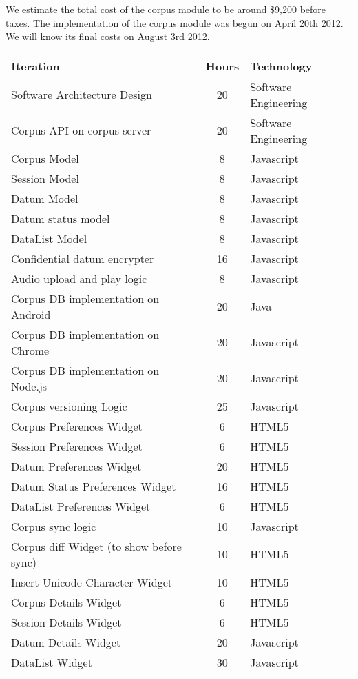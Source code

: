 \documentclass[12 pt]{article}
\begin{document}
We estimate the total cost of the corpus module to be around \$9,200 before taxes. The implementation of the corpus module was begun on April 20th 2012. We will know its final costs on August 3rd 2012.
\begin{table}[htbp]
\begin{center}
  \begin{tabular}{ | lcl | }
\hline

Iteration&	Hours&	Technology	\\
\hline
Software Architecture Design&	20&	Software Engineering	\\ 
Corpus API on corpus server&	20&	Software Engineering\\ 
Corpus Model&	8&	Javascript	\\ 
Session Model&	8&	Javascript	\\ 
Datum Model&	8&	Javascript	\\ 
Datum status model&	8&	Javascript	\\ 
DataList Model&	8&	Javascript	\\ 
Confidential datum encrypter&	16&	Javascript	\\ 
Audio upload and play logic&	8&	Javascript	\\ 
Corpus DB  implementation on Android&	20&	Java	\\ 
Corpus DB  implementation on Chrome&	20&	Javascript	\\ 
Corpus DB  implementation on Node.js&	20&	Javascript \\ 
Corpus versioning Logic&	25&	Javascript	\\ 
Corpus Preferences Widget&	6&	HTML5	\\ 
Session Preferences Widget&	6&	HTML5	\\ 
Datum Preferences Widget&	20&	HTML5 \\ 
Datum Status Preferences Widget&	16&	HTML5	\\ 
DataList Preferences Widget&	6&  HTML5 \\ 
Corpus sync logic&	10&  Javascript \\ 
Corpus diff Widget (to show before sync)&	10&  HTML5 \\ 
Insert Unicode Character Widget&	10&  HTML5 \\ 
Corpus Details Widget&	6&  HTML5 \\
Session Details Widget&	6&  HTML5 \\  
Datum Details Widget&	20&  Javascript \\ 
DataList Widget&	30&  Javascript \\ 

\end{tabular}
\end{center}
\end{table}
\end{document}
